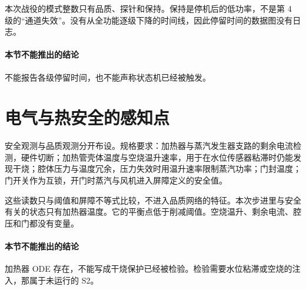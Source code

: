 本次战役的模式整数只有品质、探针和保持。保持是停机后的低功率，不是第 4 级的“通道失效”。没有从全功能逐级下降的时间线，因此停留时间的数据图没有日志。

\paragraph{本节不能推出的结论}
不能报告各级停留时间，也不能声称状态机已经被触发。

\section{电气与热安全的感知点}

安全观测与品质观测分开布设。规格要求：加热器与蒸汽发生器支路的剩余电流检测，硬件切断；加热管壳体温度与空烧温升速率，用于在水位传感器粘滞时仍能发现干烧；腔体压力与温度冗余，压力失效时用温升速率限制蒸汽功率；门封温度；门开关作为互锁，开门时蒸汽与风机进入屏障定义的安全值。

这些读数只与阈值和屏障不等式比较，不进入品质网络的特征。本次步进里与安全有关的状态只有加热器温度。它的平衡点低于削减阈值。空烧温升、剩余电流、腔压和门都没有变量。

\paragraph{本节不能推出的结论}
加热器 ODE 存在，不能写成干烧保护已经被检验。检验需要水位粘滞或空烧的注入，那属于未运行的 S2。
